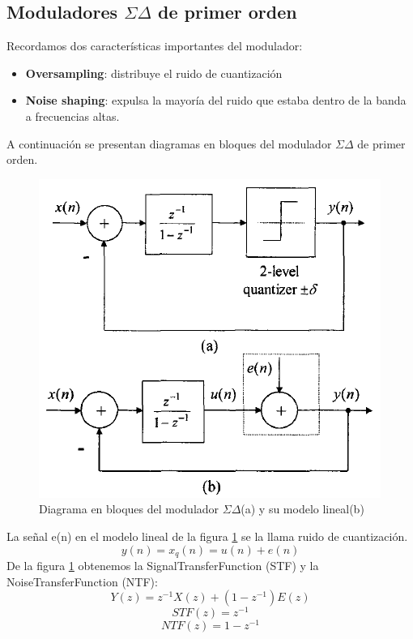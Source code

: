 \documentclass[assd_tp3_main.tex]{subfiles}
\begin{document}
\subsection{Moduladores $\Sigma\Delta$ de primer orden }
Recordamos dos características importantes del modulador:
\begin{itemize}
\item \textbf{Oversampling}: distribuye el ruido de cuantización 
\item \textbf{Noise shaping}: expulsa la mayoría del ruido que estaba dentro de la banda a frecuencias altas. 
\end{itemize}
A continuación se presentan diagramas en bloques del modulador $\Sigma\Delta$ de primer orden.
\begin{figure}[H]
\centering
\includegraphics[width=0.4\linewidth]{images/ej4/sd_linmodel.png}
\caption{Diagrama en bloques del modulador $\Sigma\Delta$(a) y su modelo lineal(b)}
\label{fig:sigmadelmod_model}
\end{figure}
La señal e(n) en el modelo lineal de la figura \ref{fig:sigmadelmod_model} se la llama ruido de cuantización.
\[ y(n)=x_q(n)= u(n)+e(n) \]
De la figura \ref{fig:sigmadelmod_model} obtenemos la SignalTransferFunction (STF) y la NoiseTransferFunction (NTF):
\[ Y(z)= z^{-1}X(z)+(1-z^{-1})E(z) \]
\[ STF(z)= z^{-1} \]
\[ NTF(z)= 1-z^{-1} \]
\end{document}
